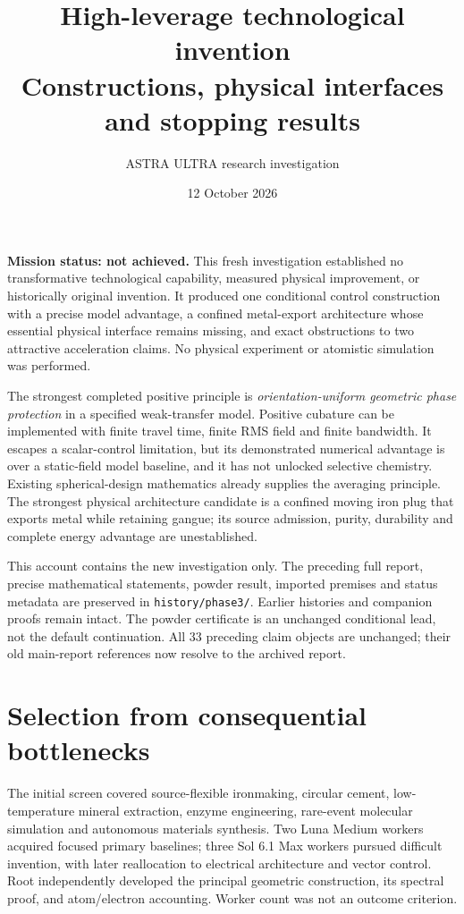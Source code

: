 \documentclass[11pt]{article}
\title{High-leverage technological invention\\Constructions, physical interfaces and stopping results}
\author{ASTRA ULTRA research investigation}
\date{12 October 2026}
\begin{document}
\maketitle

\noindent\textbf{Mission status: not achieved.}
This fresh investigation established no transformative technological capability,
measured physical improvement, or historically original invention. It produced
one conditional control construction with a precise model advantage, a confined
metal-export architecture whose essential physical interface remains missing,
and exact obstructions to two attractive acceleration claims.
No physical experiment or atomistic simulation was performed.

The strongest completed positive principle is \emph{orientation-uniform geometric
phase protection} in a specified weak-transfer model. Positive cubature can be
implemented with finite travel time, finite RMS field and finite bandwidth.
It escapes a scalar-control limitation, but its demonstrated numerical advantage
is over a static-field model baseline, and it has not unlocked selective chemistry.
Existing spherical-design mathematics already supplies the averaging principle.
The strongest physical architecture candidate is a confined moving iron plug that
exports metal while retaining gangue; its source admission, purity, durability
and complete energy advantage are unestablished.

This account contains the new investigation only. The preceding full report,
precise mathematical statements, powder result, imported premises and status
metadata are preserved in \texttt{history/phase3/}. Earlier histories and companion
proofs remain intact. The powder certificate is an unchanged conditional lead,
not the default continuation. All 33 preceding claim objects are unchanged;
their old main-report references now resolve to the archived report.

\tableofcontents

\section{Selection from consequential bottlenecks}

The initial screen covered source-flexible ironmaking, circular cement,
low-temperature mineral extraction, enzyme engineering, rare-event molecular
simulation and autonomous materials synthesis. Two Luna Medium workers acquired
focused primary baselines; three Sol 6.1 Max workers pursued difficult invention,
with later reallocation to electrical architecture and vector control. Root
independently developed the principal geometric construction, its spectral
proof, and atom/electron accounting. Worker count was not an outcome criterion.
\end{document}
